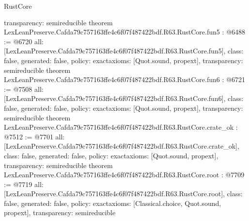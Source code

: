 \begin{lexlean}{RustCore}
\begin{coremodule}
{  transparency: semireducible
}
theorem LexLeanPreserve.Cafda79c757163ffe4c6f07f487422bdf.R63.RustCore.fun5 : @6488 := @6720 {
  all: [LexLeanPreserve.Cafda79c757163ffe4c6f07f487422bdf.R63.RustCore.fun5],
  class: false,
  generated: false,
  policy: exact{axioms: [Quot.sound, propext]},
  transparency: semireducible
}
theorem LexLeanPreserve.Cafda79c757163ffe4c6f07f487422bdf.R63.RustCore.fun6 : @6721 := @7508 {
  all: [LexLeanPreserve.Cafda79c757163ffe4c6f07f487422bdf.R63.RustCore.fun6],
  class: false,
  generated: false,
  policy: exact{axioms: [Quot.sound, propext]},
  transparency: semireducible
}
theorem LexLeanPreserve.Cafda79c757163ffe4c6f07f487422bdf.R63.RustCore.crate_ok : @7512 := @7701 {
  all: [LexLeanPreserve.Cafda79c757163ffe4c6f07f487422bdf.R63.RustCore.crate_ok],
  class: false,
  generated: false,
  policy: exact{axioms: [Quot.sound, propext]},
  transparency: semireducible
}
theorem LexLeanPreserve.Cafda79c757163ffe4c6f07f487422bdf.R63.RustCore.root : @7709 := @7719 {
  all: [LexLeanPreserve.Cafda79c757163ffe4c6f07f487422bdf.R63.RustCore.root],
  class: false,
  generated: false,
  policy: exact{axioms: [Classical.choice, Quot.sound, propext]},
  transparency: semireducible
}


\end{coremodule}
\end{lexlean}
